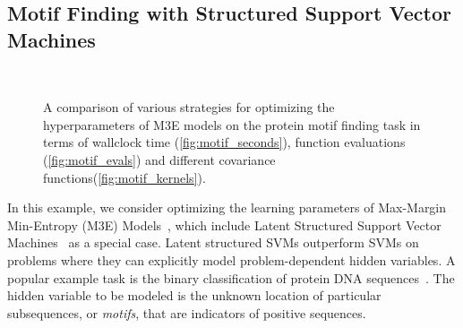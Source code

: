 \documentclass[aos,preprint]{imsart}
\begin{document}
\subsection{Motif Finding with Structured Support Vector Machines}
\begin{figure}[ht]
\begin{center}
\\
\end{center}
\caption{A comparison of various strategies for optimizing the
  hyperparameters of M3E models on the protein motif finding task in
  terms of wallclock time (\ref{fig:motif_seconds}), function evaluations
  (\ref{fig:motif_evals}) and different covariance functions(\ref{fig:motif_kernels}).}
\end{figure}

In this example, we consider optimizing the learning parameters of
Max-Margin Min-Entropy (M3E) Models~\citep{Miller-etal-2012}, which
include Latent Structured Support Vector
Machines~\citep{Yu-Joachims-2009} as a special case.  Latent structured
SVMs outperform SVMs on problems where they can explicitly model
problem-dependent hidden variables. A popular example task is the
binary classification of protein DNA
sequences~\citep{Miller-etal-2012,Kumar-etal-2010,Yu-Joachims-2009}.
The hidden variable to be modeled is the unknown location of
particular subsequences, or \emph{motifs}, that are indicators of
positive sequences.
\end{document}
